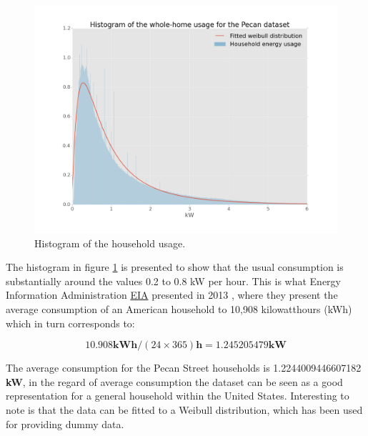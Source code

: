 \begin{figure}[H]
	\centering
		\includegraphics[scale=0.30]{./figures/new_histusage}
		\caption{Histogram of the household usage.}
		\label{fig:histuseage}
\end{figure}

The histogram in figure \ref{fig:histuseage} is presented to show that the usual consumption is substantially around the values 0.2 to 0.8 kW per hour. This is what Energy Information Administration \href{http://www.eia.gov/tools/faqs/faq.cfm?id=97&t=3}{EIA} presented in 2013 \cite{eia}, where they present the average consumption of an American household to 10,908 kilowatthours (kWh) which in turn corresponds to:

\begin{equation*}
	10.908 \textbf{kWh} / (24\times365) \textbf{h} = 1.245205479 \textbf{kW}
\end{equation*}

The average consumption for the Pecan Street households is 1.2244009446607182 \textbf{kW}, in the regard of average consumption the dataset can be seen as a good representation for a general household within the United States. Interesting to note is that the data can be fitted to a Weibull distribution, which has been used for providing dummy data.

\newpage
